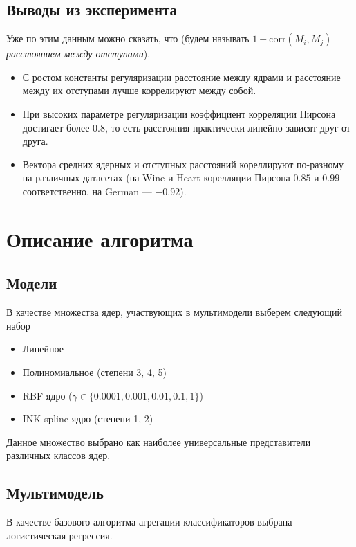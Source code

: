 \documentclass[12pt,twoside]{article}
\theoremstyle{plain}
\theoremstyle{remark}
\theoremstyle{definition}
\begin{document}


\subsection{Выводы из эксперимента}

Уже по этим данным можно сказать, что (будем называть $1 - \mathrm{corr}(M_i, M_j)$ 
\emph{расстоянием между отступами}).
\begin{itemize}
  \item С ростом константы регуляризации расстояние между ядрами и расстояние между	
  их отступами лучше коррелируют между собой.
  \item При высоких параметре регуляризации коэффициент корреляции Пирсона 
  достигает более $0.8$, то есть расстояния практически линейно зависят друг от друга.
  \item Вектора средних ядерных и отступных расстояний кореллируют по-разному на различных датасетах (на Wine и Heart корелляции Пирсона $0.85$ и $0.99$ соответственно, на German --- $-0.92$).
\end{itemize} 

\section{Описание алгоритма}

\subsection{Модели}

В качестве множества ядер, участвующих в мультимодели выберем следующий набор

\begin{itemize}
    \item Линейное
    \item Полиномиальное (степени 3, 4, 5)
    \item RBF-ядро ($\gamma \in \{0.0001, 0.001, 0.01, 0.1, 1\}$)
    \item INK-spline ядро (степени 1, 2)
\end{itemize}

Данное множество выбрано как наиболее универсальные представители различных классов ядер. 

\subsection{Мультимодель}

В качестве базового алгоритма агрегации классификаторов выбрана логистическая регрессия.
\end{document}
